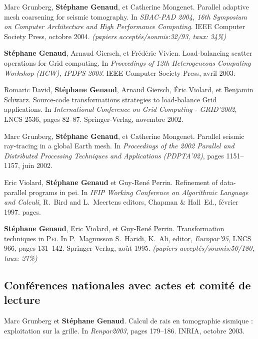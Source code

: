 \documentclass[11pt]{article}
\begin{document}
\begin{thebibliography}{99}
Marc Grunberg, \textbf{Stéphane Genaud}, et Catherine Mongenet.
\newblock Parallel adaptive mesh coarsening for seismic tomography.
\newblock In {\em SBAC-PAD 2004, 16th Symposium on Computer Architecture and
  High Performance Computing}. IEEE Computer Society Press, octobre 2004.
\newblock \small{\textit{(papiers acceptés/soumis:32/93, taux: 34\%)}}

\textbf{Stéphane Genaud}, Arnaud Giersch, et Frédéric Vivien.
\newblock Load-balancing scatter operations for Grid computing.
\newblock In {\em Proceedings of 12th Heterogeneous Computing Workshop 
(HCW), IPDPS 2003}. IEEE Computer Society Press, avril 2003.

Romaric David, \textbf{Stéphane Genaud}, Arnaud Giersch, \'{E}ric Violard, et 
  Benjamin Schwarz.
\newblock Source-code transformations strategies to load-balance Grid
  applications.
\newblock In {\em International Conference on Grid Computing - GRID'2002}, LNCS 2536,
  pages 82--87. Springer-Verlag, novembre 2002.

Marc Grunberg, \textbf{Stéphane Genaud}, et Catherine Mongenet.
\newblock Parallel seismic ray-tracing in a global {E}arth mesh.
\newblock In {\em Proceedings of the 2002 Parallel and Distributed Processing
  Techniques and Applications (PDPTA'02)}, pages 1151--1157, juin 2002.

Eric Violard, \textbf{Stéphane Genaud} et Guy-René Perrin.
\newblock Refinement of data-parallel programs in pei.
\newblock In {\em IFIP Working Conference on Algorithmic Language and Calculi}, 
R.~Bird and L.~Meertens editors, Chapman \& Hall~Ed., février 1997.
 pages.

\textbf{Stéphane Genaud}, Eric Violard, et Guy-René Perrin.
\newblock Transformation techniques in \textsc{Pei}.
\newblock In P.~Magnusson S.~Haridi, K.~Ali, editor, {\em Europar'95}, LNCS
  966, pages 131--142. Springer-Verlag, août 1995.
\newblock \small{\textit{(papiers acceptés/soumis:50/180, taux: 27\%)}}




\subsection*{Conférences nationales avec actes et comité de lecture}
Marc Grunberg et \textbf{Stéphane Genaud}.
\newblock Calcul de rais en tomographie sismique : exploitation sur la grille.
\newblock In {\em Renpar2003}, pages 179--186. INRIA, octobre 2003.


\end{thebibliography}
\end{document}
